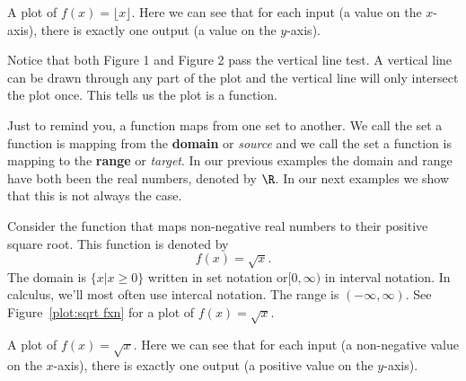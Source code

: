 \documentclass{ximera}
\begin{document}
\begin{marginfigure}[0in]
\caption{A plot of $f(x)=\lfloor x\rfloor$. Here we can see that for each input (a
  value on the $x$-axis), there is exactly one output (a value on the
  $y$-axis).}
\label{plot:greatest-integer fxn}
\end{marginfigure}


Notice that both Figure 1 and Figure 2 pass the vertical line test.  A vertical line can be drawn through any part of the plot and the vertical line will only intersect the plot once.  This tells us the plot is a function.

Just to remind you, a function maps from one set to another. We call
the set a function is mapping from the \textbf{domain}
or \textit{source} and we call the set a function is mapping to the
\textbf{range} or \textit{target}.  In our previous
examples the domain and range have both been the real numbers, denoted
by $\R$. In our next examples we show that this is not always the
case.


\begin{example}
Consider the function that maps non-negative real numbers to their positive square root. This function is denoted by 
\[
f(x) = \sqrt{x}.
\]
The domain is $\{x\left| x\ge 0\}$ written in set notation or$[0,\infty )$ in interval notation.  In calculus, we'll most often use intercal notation.  The range is $(-\infty,\infty)$.
See Figure~\ref{plot:sqrt fxn} for a plot of $f(x) = \sqrt{x}$.
\end{example}

\begin{marginfigure}[0in]
\caption{A plot of $f(x)=\sqrt{x}$. Here we can see that for each
  input (a non-negative value on the $x$-axis), there is exactly one
  output (a positive value on the $y$-axis).}
\label{plot:sqrt fxn}
\end{marginfigure}
\end{document}
